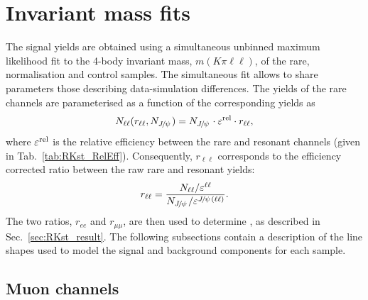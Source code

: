 \section{Invariant mass fits}
\label{sec:rkst_fits}

The signal yields are obtained using a simultaneous unbinned maximum likelihood fit
to the 4-body invariant mass, $m(K\pi\ell\ell)$, of the rare, normalisation and control samples.
The simultaneous fit allows to share parameters \eg those describing data-simulation differences.
The yields of the rare channels are parameterised as a function of the corresponding \jpsi yields as
%
\begin{equation}
N_{\ell\ell}(r_{\ell\ell}, N_{\jpsi}) = N_{\jpsi} \cdot \varepsilon^{\rm rel} \cdot r_{\ell\ell},
\end{equation}
%
where $\varepsilon^{\rm rel}$ is the relative efficiency between the rare and resonant channels
(given in Tab.~\ref{tab:RKst_RelEff}). Consequently, $r_{\ell\ell}$ corresponds to the efficiency corrected
ratio between the raw rare and resonant yields:
%
\begin{equation}
r_{\ell\ell} = \frac{N_{\ell\ell} / \varepsilon^{\ell\ell}}{N_{\jpsi} / \varepsilon^{\jpsi(\ell\ell)}}.
\end{equation}
%
The two ratios, $r_{ee}$ and $r_{\mu\mu}$, are then used to determine
\RKst, as described in Sec.~\ref{sec:RKst_result}.
The following subsections contain a description of the line shapes used to model
the signal and background components for each sample.

\subsection{Muon channels}

